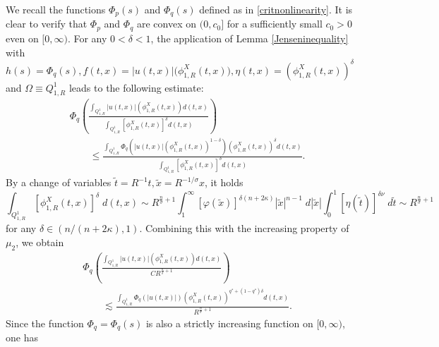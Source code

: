 \documentclass[11pt,reqno]{amsart}
\newcommand{\tron}[1]{\left( #1 \right)}
\numberwithin{equation}{section}
\begin{document}
We recall the functions $\Phi_p(s)$ and $\Phi_q(s)$ defined as in \eqref{critnonlinearity}. It is clear to verify that $\Phi_p$ and $\Phi_q$ are convex on $(0, c_0]$ for a sufficiently small $c_0 > 0$ even on $[0, \infty)$. For any $0<\delta<1$, the application of Lemma \ref{Jenseninequality} with $h(s)=\Phi_q(s), f(t,x)=|u(t,x)|\big(\phi^{X}_{1,R}(t,x)\big),\eta(t,x)=(\phi^{X}_{1,R}(t,x))^{\delta}$ and $\Omega \equiv  Q^1_{1,R}$ leads to the following estimate:
\[
\begin{aligned}
&\Phi_q\left(\frac{\int_{Q^1_{1,R}}|u(t,x)|\left(\phi^{X}_{1,R}(t,x)\right)  d(t,x)}{\int_{Q^1_{1,R}}[\phi^{X}_{1,R}(t,x)]^{\delta}d(t,x)}\right) \\
&\quad \quad \leq \frac{\int_{Q^1_{1,R}}\Phi_q\left(|u(t,x)|\left(\phi^{X}_{1,R}(t,x)\right)^{1-\delta}\right)(\phi^{X}_{1,R}(t,x))^{\delta}d(t,x)}{\int_{Q^1_{1,R}}[\phi^{X}_{1,R}(t,x)]^{\delta}d(t,x)}.
\end{aligned}
\]
By a change of variables $\tilde{t}=R^{-1}t, \tilde{x}=R^{-1/\sigma} x$, it holds
$$
\int_{Q^1_{1,R}}[\phi^{X}_{1,R}(t,x)]^{\delta}\;d(t,x)\sim R^{\frac{n}{\sigma}+1}\int_{1}^{\infty}[\varphi(\tilde{x})]^{\delta(n+2\kappa)}|\tilde{x}|^{n-1}\;d|\tilde{x}|\int_{0}^{1}[\eta(\tilde{t})]^{\delta \nu}\;d\tilde{t}\sim R^{\frac{n}{\sigma}+1}
$$
for any $\delta\in (n/(n+2\kappa),1)$. Combining this with the increasing property of $\mu_2$, we obtain
\begin{align*}
&\Phi_q\left(\frac{\int_{Q^1_{1,R}}|u(t,x)|\left(\phi^{X}_{1,R}(t,x)\right)d(t,x)}{CR^{\frac{n}{\sigma}+1}}\right)\nonumber \\
&\qquad\lesssim \frac{\int_{Q^1_{1,R}}\Phi_q(|u(t,x)|)\left(\phi^{X}_{1,R}(t,x)\right)^{q^*+(1-q^*)\delta}d(t,x)}{R^{\frac{n}{\sigma}+1}}.
\end{align*}
Since the function $\Phi_q=\Phi_q(s)$ is also a strictly increasing function on $[0, \infty)$, one has
\end{document}
